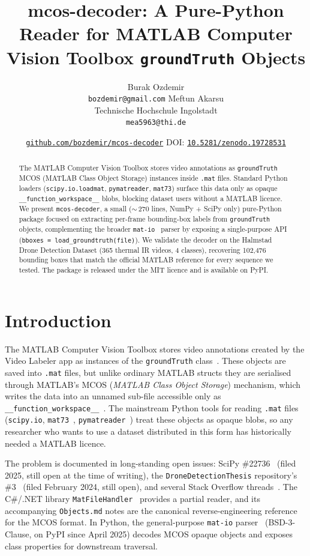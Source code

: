 \documentclass{article}
\title{mcos-decoder: A Pure-Python Reader for MATLAB Computer Vision Toolbox \texttt{groundTruth} Objects}
\author{
  Burak Ozdemir \\
  \texttt{bozdemir@gmail.com}
  \And
  Meftun Akarsu \\
  Technische Hochschule Ingolstadt \\
  \texttt{mea5963@thi.de}
}
\date{\href{https://github.com/bozdemir/mcos-decoder}{\texttt{github.com/bozdemir/mcos-decoder}} \quad DOI: \href{https://doi.org/10.5281/zenodo.19728531}{\texttt{10.5281/zenodo.19728531}}}
\begin{document}
\maketitle

\begin{abstract}
The MATLAB Computer Vision Toolbox stores video annotations as
\texttt{groundTruth} MCOS (MATLAB Class Object Storage) instances inside
\texttt{.mat} files. Standard Python loaders (\texttt{scipy.io.loadmat},
\texttt{pymatreader}, \texttt{mat73}) surface this data only as opaque
\texttt{\_\_function\_workspace\_\_} blobs, blocking dataset users
without a MATLAB licence. We present \texttt{mcos-decoder}, a small
($\sim$\,270 lines, NumPy + SciPy only) pure-Python package focused on
extracting per-frame bounding-box labels from \texttt{groundTruth}
objects, complementing the broader \texttt{mat-io}~\cite{matio} parser
by exposing a single-purpose API
(\texttt{bboxes = load\_groundtruth(file)}). We validate the decoder on
the Halmstad Drone Detection Dataset (365 thermal IR videos, 4 classes),
recovering 102{,}476 bounding boxes that match the official MATLAB
reference for every sequence we tested. The package is released under
the MIT licence and is available on PyPI.
\end{abstract}


\section{Introduction}

The MATLAB Computer Vision Toolbox stores video annotations created by
the Video Labeler app as instances of the \texttt{groundTruth}
class~\cite{matlabcv}. These objects are saved into \texttt{.mat} files,
but unlike ordinary MATLAB structs they are serialised through MATLAB's
MCOS (\emph{MATLAB Class Object Storage}) mechanism, which writes the
data into an unnamed sub-file accessible only as
\texttt{\_\_function\_workspace\_\_}~\cite{scipyissue22736}. The
mainstream Python tools for reading \texttt{.mat} files
(\texttt{scipy.io}, \texttt{mat73}~\cite{mat73},
\texttt{pymatreader}~\cite{pymatreader}) treat these objects as opaque
blobs, so any researcher who wants to use a dataset distributed in this
form has historically needed a MATLAB licence.

The problem is documented in long-standing open issues: SciPy
\#22736~\cite{scipyissue22736} (filed 2025, still open at the time of
writing), the \texttt{DroneDetectionThesis} repository's
\#3~\cite{droneissue3} (filed February 2024, still open), and several
Stack Overflow threads~\cite{somat}. The C\#/.NET library
\texttt{MatFileHandler}~\cite{matfilehandler} provides a partial reader,
and its accompanying \texttt{Objects.md} notes are the canonical
reverse-engineering reference for the MCOS format. In Python, the
general-purpose \texttt{mat-io} parser~\cite{matio} (BSD-3-Clause, on
PyPI since April 2025) decodes MCOS opaque objects and exposes class
properties for downstream traversal.
\end{document}
